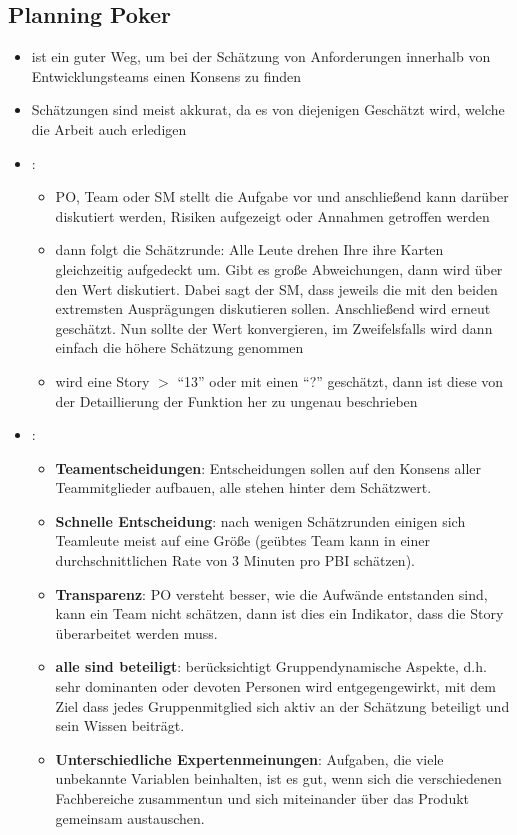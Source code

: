 \subsection{Planning Poker}
\begin{itemize}
  \item ist ein guter Weg, um bei der Schätzung von Anforderungen innerhalb von
    Entwicklungsteams einen Konsens zu finden
  \item Schätzungen sind meist akkurat, da es von diejenigen Geschätzt wird, welche die Arbeit
    auch erledigen
  \item {}:
    \begin{itemize}
      \item PO, Team oder SM stellt die Aufgabe vor und anschließend kann
        darüber diskutiert werden, Risiken aufgezeigt oder Annahmen getroffen werden
      \item dann folgt die Schätzrunde: Alle Leute drehen Ihre ihre Karten gleichzeitig aufgedeckt
        um. Gibt es große Abweichungen, dann wird
        über den Wert diskutiert. Dabei sagt der SM, dass jeweils die mit den beiden
        extremsten Ausprägungen diskutieren sollen. Anschließend wird erneut geschätzt. Nun
        sollte der Wert konvergieren, im Zweifelsfalls wird dann einfach die höhere Schätzung
        genommen
      \item wird eine Story $>$ \enquote{13} oder mit einen \enquote{?} geschätzt, dann ist diese von der
        Detaillierung der Funktion her zu ungenau beschrieben
    \end{itemize}
  \item {}:
    \begin{itemize}
      \item \textbf{Teamentscheidungen}: Entscheidungen sollen auf den Konsens aller
        Teammitglieder aufbauen, alle stehen hinter dem Schätzwert.
      \item \textbf{Schnelle Entscheidung}: nach wenigen Schätzrunden einigen sich Teamleute
        meist auf eine Größe (geübtes Team kann in einer durchschnittlichen Rate von 3 Minuten pro
        PBI schätzen).
      \item \textbf{Transparenz}: PO versteht besser, wie die Aufwände entstanden sind, kann
        ein Team nicht schätzen, dann ist dies ein Indikator, dass die Story überarbeitet
        werden muss.
      \item \textbf{alle sind beteiligt}: berücksichtigt Gruppendynamische Aspekte, d.h. sehr dominanten oder devoten Personen
        wird entgegengewirkt, mit dem Ziel dass jedes Gruppenmitglied sich aktiv an der Schätzung
        beteiligt und sein Wissen beiträgt.
      \item \textbf{Unterschiedliche Expertenmeinungen}: Aufgaben, die viele unbekannte Variablen beinhalten, ist es gut,
        wenn sich die verschiedenen Fachbereiche zusammentun und sich miteinander über das
        Produkt gemeinsam austauschen.
    \end{itemize}
\end{itemize}


